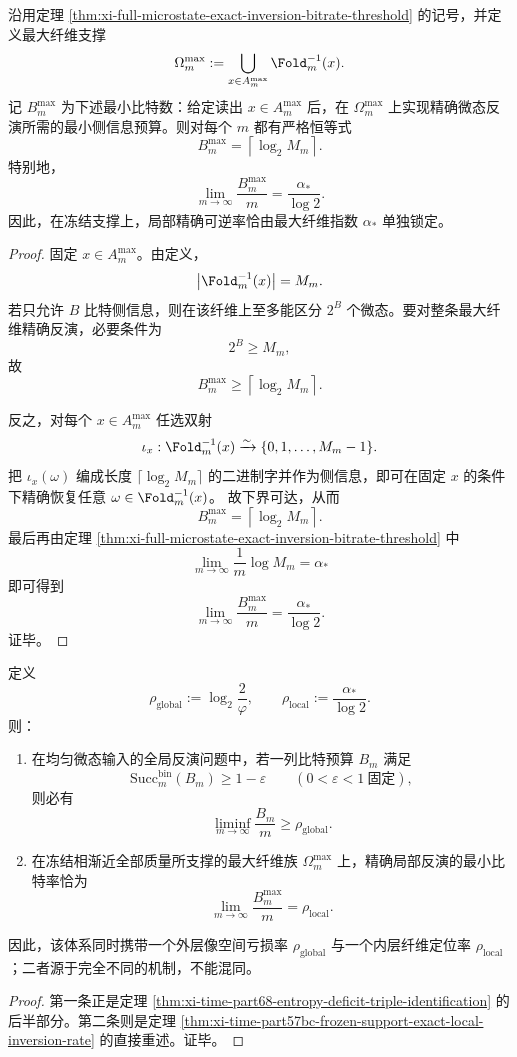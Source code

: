 \begin{theorem}[冻结支撑上的精确局部反演率]\label{thm:xi-time-part57bc-frozen-support-exact-local-inversion-rate}
沿用定理 \ref{thm:xi-full-microstate-exact-inversion-bitrate-threshold} 的记号，并定义最大纤维支撑
\[
\Omega_m^{\max}
:=
\bigcup_{x\in A_m^{\max}}\Fold_m^{-1}(x).
\]
记 \(B_m^{\max}\) 为下述最小比特数：给定读出 \(x\in A_m^{\max}\) 后，在 \(\Omega_m^{\max}\) 上实现精确微态反演所需的最小侧信息预算。则对每个 \(m\) 都有严格恒等式
\[
B_m^{\max}
=
\left\lceil \log_2 M_m\right\rceil.
\]
特别地，
\[
\lim_{m\to\infty}\frac{B_m^{\max}}{m}
=
\frac{\alpha_*}{\log 2}.
\]
因此，在冻结支撑上，局部精确可逆率恰由最大纤维指数 \(\alpha_*\) 单独锁定。
\end{theorem}
\begin{proof}
固定 \(x\in A_m^{\max}\)。由定义，
\[
\bigl|\Fold_m^{-1}(x)\bigr|=M_m.
\]
若只允许 \(B\) 比特侧信息，则在该纤维上至多能区分 \(2^B\) 个微态。要对整条最大纤维精确反演，必要条件为
\[
2^B\ge M_m,
\]
故
\[
B_m^{\max}\ge \left\lceil \log_2 M_m\right\rceil.
\]

反之，对每个 \(x\in A_m^{\max}\) 任选双射
\[
\iota_x:\Fold_m^{-1}(x)\xrightarrow{\sim}\{0,1,\dots,M_m-1\}.
\]
把 \(\iota_x(\omega)\) 编成长度 \(\lceil\log_2M_m\rceil\) 的二进制字并作为侧信息，即可在固定 \(x\) 的条件下精确恢复任意
\(\omega\in\Fold_m^{-1}(x)\)。
故下界可达，从而
\[
B_m^{\max}
=
\left\lceil \log_2 M_m\right\rceil.
\]
最后再由定理 \ref{thm:xi-full-microstate-exact-inversion-bitrate-threshold} 中
\[
\lim_{m\to\infty}\frac{1}{m}\log M_m=\alpha_*
\]
即可得到
\[
\lim_{m\to\infty}\frac{B_m^{\max}}{m}
=
\frac{\alpha_*}{\log 2}.
\]
证毕。
\end{proof}

\begin{corollary}[两种信息温度的严格分离]\label{cor:xi-time-part57bc-two-information-temperature-separation}
定义
\[
\rho_{\mathrm{global}}:=\log_2\frac{2}{\varphi},
\qquad
\rho_{\mathrm{local}}:=\frac{\alpha_*}{\log 2}.
\]
则：
\begin{enumerate}
  \item 在均匀微态输入的全局反演问题中，若一列比特预算 \(B_m\) 满足
  \[
  \mathrm{Succ}_m^{\mathrm{bin}}(B_m)\ge 1-\varepsilon
  \qquad
  (0<\varepsilon<1\ \text{固定}),
  \]
  则必有
  \[
  \liminf_{m\to\infty}\frac{B_m}{m}\ge \rho_{\mathrm{global}}.
  \]
  \item 在冻结相渐近全部质量所支撑的最大纤维族 \(\Omega_m^{\max}\) 上，精确局部反演的最小比特率恰为
  \[
  \lim_{m\to\infty}\frac{B_m^{\max}}{m}
  =
  \rho_{\mathrm{local}}.
  \]
\end{enumerate}
因此，该体系同时携带一个外层像空间亏损率 \(\rho_{\mathrm{global}}\) 与一个内层纤维定位率 \(\rho_{\mathrm{local}}\)；二者源于完全不同的机制，不能混同。
\end{corollary}
\begin{proof}
第一条正是定理 \ref{thm:xi-time-part68-entropy-deficit-triple-identification} 的后半部分。第二条则是定理 \ref{thm:xi-time-part57bc-frozen-support-exact-local-inversion-rate} 的直接重述。证毕。
\end{proof}

